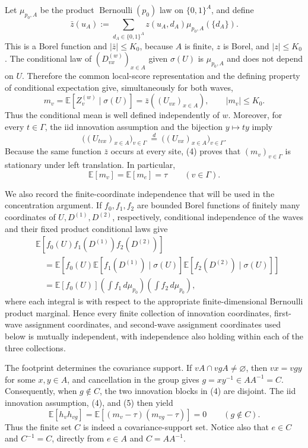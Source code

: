 Let \(\mu_{p_0,A}\) be the product \(\operatorname{Bernoulli}(p_0)\) law on \(\{0,1\}^A\), and define
\[
 \bar z(u_A)
 :=\sum_{d_A\in\{0,1\}^A}
 z(u_A,d_A)\mu_{p_0,A}(\{d_A\}). \tag{3}
\]
This is a Borel function and \(|\bar z|\le K_0\), because \(A\) is finite, \(z\) is Borel, and \(|z|\le K_0\).  The conditional law of \((D_{vx}^{(w)})_{x\in A}\) given \(\sigma(U)\) is \(\mu_{p_0,A}\) and does not depend on \(U\).  Therefore the common local-score representation and the defining property of conditional expectation give, simultaneously for both waves,
\[
 m_v
 =\mathbb E[Z_v^{(w)}\mid\sigma(U)]
 =\bar z((U_{vx})_{x\in A}),
 \qquad |m_v|\le K_0. \tag{4}
\]
Thus the conditional mean is well defined independently of \(w\).  Moreover, for every \(t\in\Gamma\), the iid innovation assumption and the bijection \(y\mapsto ty\) imply
\[
 \bigl((U_{tvx})_{x\in A}\bigr)_{v\in\Gamma}
 \ \stackrel{d}{=}\ 
 \bigl((U_{vx})_{x\in A}\bigr)_{v\in\Gamma}.
\]
Because the same function \(\bar z\) occurs at every site, (4) proves that \((m_v)_{v\in\Gamma}\) is stationary under left translation.  In particular,
\[
 \mathbb E[m_v]=\mathbb E[m_e]=\tau
 \qquad(v\in\Gamma). \tag{5}
\]

We also record the finite-coordinate independence that will be used in the concentration argument.  If \(f_0,f_1,f_2\) are bounded Borel functions of finitely many coordinates of \(U,D^{(1)},D^{(2)}\), respectively, conditional independence of the waves and their fixed product conditional laws give
\[
 \begin{aligned}
 &\mathbb E[f_0(U)f_1(D^{(1)})f_2(D^{(2)})]\\
 &\quad=\mathbb E\!\left[
 f_0(U)\mathbb E[f_1(D^{(1)})\mid\sigma(U)]
          \mathbb E[f_2(D^{(2)})\mid\sigma(U)]\right]\\
 &\quad=\mathbb E[f_0(U)]
       \left(\int f_1\,d\mu_{p_0}\right)
       \left(\int f_2\,d\mu_{p_0}\right),
 \end{aligned} \tag{6}
\]
where each integral is with respect to the appropriate finite-dimensional Bernoulli product marginal.  Hence every finite collection of innovation coordinates, first-wave assignment coordinates, and second-wave assignment coordinates used below is mutually independent, with independence also holding within each of the three collections.

The footprint determines the covariance support.  If \(vA\cap vgA\ne\varnothing\), then \(vx=vgy\) for some \(x,y\in A\), and cancellation in the group gives \(g=xy^{-1}\in AA^{-1}=C\).  Consequently, when \(g\notin C\), the two innovation blocks in (4) are disjoint.  The iid innovation assumption, (4), and (5) then yield
\[
 \mathbb E[h_vh_{vg}]
 =\mathbb E[(m_v-\tau)(m_{vg}-\tau)]=0
 \qquad(g\notin C). \tag{7}
\]
Thus the finite set \(C\) is indeed a covariance-support set.  Notice also that \(e\in C\) and \(C^{-1}=C\), directly from \(e\in A\) and \(C=AA^{-1}\).

